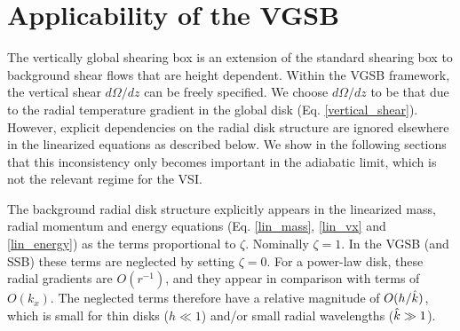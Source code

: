 \section{Applicability of the  VGSB}\label{global_corr}
The vertically global shearing box  is an
extension of the standard shearing box \citep[SSB,][]{goldreich65} to
background shear flows that are height dependent. 
Within the VGSB framework, the vertical shear $d\Omega/dz$
can be freely specified. We choose $d\Omega/dz$ to be that due to the
radial temperature gradient in the global disk
(Eq. \ref{vertical_shear}). However, explicit dependencies on the
radial disk structure are ignored elsewhere in the linearized equations
as described below. We show in the following sections that this
inconsistency only becomes important in the adiabatic limit, which is
not the relevant regime for the VSI. 


The background radial disk structure explicitly appears 
in the linearized mass, radial momentum and energy equations
(Eq. \ref{lin_mass}, \ref{lin_vx} and \ref{lin_energy}) as the terms
proportional to $\zeta$. Nominally $\zeta=1$.      
In the VGSB (and SSB) these terms are neglected by setting
$\zeta=0$. For a power-law disk, these radial gradients  
are $O(r^{-1})$, and they appear in comparison with terms of
$O(k_x)$. The neglected terms therefore have a relative magnitude of
$O(h/\hat{k})$, which is small for thin disks ($h\ll1$)
and/or small radial wavelengths ($\hat{k}\gg 1$). 
 




   
